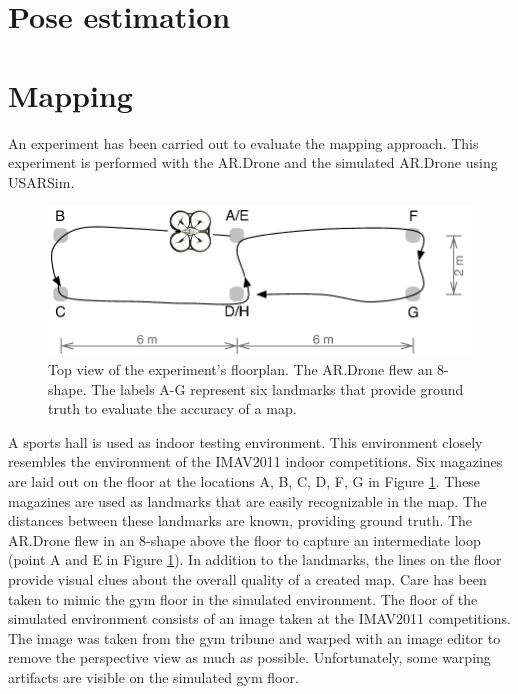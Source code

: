 	\section{Pose estimation}
	\section{Mapping}
An experiment has been carried out to evaluate the mapping approach.
This experiment is performed with the AR.Drone and the simulated AR.Drone using USARSim.

\begin{figure}[htb]
\centering
\includegraphics[width=13.0cm]{images/floorplan.pdf} %
\caption{Top view of the experiment's floorplan. The AR.Drone flew an 8-shape. The labels A-G represent six landmarks that provide ground truth to evaluate the accuracy of a map.}
\label{fig:exp_floorplan}
\end{figure}

A sports hall is used as indoor testing environment. This environment closely resembles the environment of the IMAV2011 indoor competitions.
Six magazines are laid out on the floor at the locations A, B, C, D, F, G in Figure \ref{fig:exp_floorplan}.
These magazines are used as landmarks that are easily recognizable in the map.
The distances between these landmarks are known, providing ground truth.
The AR.Drone flew in an 8-shape above the floor to capture an intermediate loop (point A and E in Figure \ref{fig:exp_floorplan}).
In addition to the landmarks, the lines on the floor provide visual clues about the overall quality of a created map.
Care has been taken to mimic the gym floor in the simulated environment.
The floor of the simulated environment consists of an image taken at the IMAV2011 competitions. 
The image was taken from the gym tribune and warped with an image editor to remove the perspective view as much as possible.
Unfortunately, some warping artifacts are visible on the simulated gym floor.

